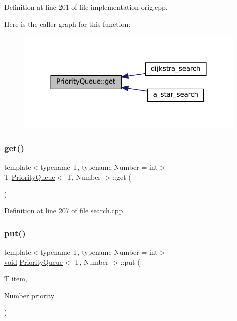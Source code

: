 Definition at line 201 of file implementation orig.\+cpp.

Here is the caller graph for this function\+:\nopagebreak
\begin{figure}[H]
\begin{center}
\leavevmode
\includegraphics[width=312pt]{struct_priority_queue_ab211c9583fda5c1a6352021444af5f0e_icgraph}
\end{center}
\end{figure}
\mbox{\label{struct_priority_queue_ab211c9583fda5c1a6352021444af5f0e}} 
\subsubsection{\texorpdfstring{get()}{get()}\hspace{0.1cm}{\footnotesize\ttfamily [2/2]}}
{\footnotesize\ttfamily template$<$typename T, typename Number = int$>$ \\
T \mbox{\hyperlink{struct_priority_queue}{Priority\+Queue}}$<$ T, Number $>$\+::get (\begin{DoxyParamCaption}{ }\end{DoxyParamCaption})\hspace{0.3cm}{\ttfamily [inline]}}



Definition at line 207 of file search.\+cpp.

\mbox{\label{struct_priority_queue_a9361c94664b98a15a91a595d65c9846c}} 
\subsubsection{\texorpdfstring{put()}{put()}\hspace{0.1cm}{\footnotesize\ttfamily [1/2]}}
{\footnotesize\ttfamily template$<$typename T, typename Number = int$>$ \\
\mbox{\hyperlink{glad_8h_a950fc91edb4504f62f1c577bf4727c29}{void}} \mbox{\hyperlink{struct_priority_queue}{Priority\+Queue}}$<$ T, Number $>$\+::put (\begin{DoxyParamCaption}\item[{T}]{item,  }\item[{Number}]{priority }\end{DoxyParamCaption})\hspace{0.3cm}{\ttfamily [inline]}}



